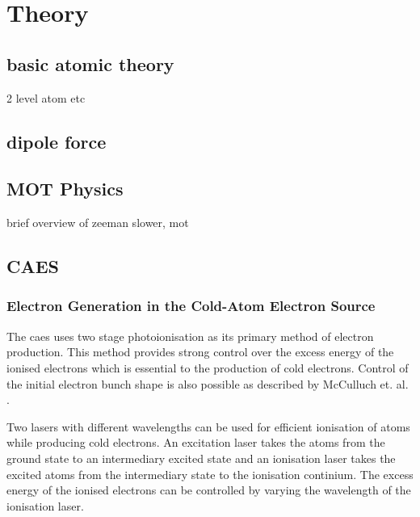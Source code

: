 \chapter{Theory}

\section{basic atomic theory}

2 level atom etc

\section{dipole force}

\section{MOT Physics}

brief overview of zeeman slower, mot

\section{CAES}

\subsection{Electron Generation in the Cold-Atom Electron Source}
The \gls{caes} uses two stage photoionisation as its primary method of electron production. This method provides strong control over the excess energy of the ionised electrons which is essential to the production of cold electrons. Control of the initial electron bunch shape is also possible as described by McCulluch et. al. \cite{mcculloch_arbitrarily_2011}.

Two lasers with different wavelengths can be used for efficient ionisation of atoms while producing cold electrons. An excitation laser takes the atoms from the ground state to an intermediary excited state and an ionisation laser takes the excited atoms from the intermediary state to the ionisation continium. The excess energy of the ionised electrons can be controlled by varying the wavelength of the ionisation laser.

